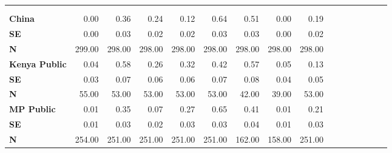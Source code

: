 \begin{tabular}{@{\extracolsep{5pt}}lrrrrrrrrrrrrrrr}
\toprule
&  &  &  &  &  &  &  &  \\
{\bf } &  &  &  &  &  &  &  &  \\
\hline
{\bf China} & 0.00\phantom{***} & 0.36\phantom{***} & 0.24\phantom{***} & 0.12\phantom{***} & 0.64\phantom{***} & 0.51\phantom{***} & 0.00\phantom{***} & 0.19\phantom{***} \\
{\bf SE} & 0.00\phantom{***} & 0.03\phantom{***} & 0.02\phantom{***} & 0.02\phantom{***} & 0.03\phantom{***} & 0.03\phantom{***} & 0.00\phantom{***} & 0.02\phantom{***} \\
{\bf N} & 299.00\phantom{***} & 298.00\phantom{***} & 298.00\phantom{***} & 298.00\phantom{***} & 298.00\phantom{***} & 298.00\phantom{***} & 298.00\phantom{***} & 298.00\phantom{***} \\
{\bf Kenya Public} & 0.04\phantom{***} & 0.58\phantom{***} & 0.26\phantom{***} & 0.32\phantom{***} & 0.42\phantom{***} & 0.57\phantom{***} & 0.05\phantom{***} & 0.13\phantom{***} \\
{\bf SE} & 0.03\phantom{***} & 0.07\phantom{***} & 0.06\phantom{***} & 0.06\phantom{***} & 0.07\phantom{***} & 0.08\phantom{***} & 0.04\phantom{***} & 0.05\phantom{***} \\
{\bf N} & 55.00\phantom{***} & 53.00\phantom{***} & 53.00\phantom{***} & 53.00\phantom{***} & 53.00\phantom{***} & 42.00\phantom{***} & 39.00\phantom{***} & 53.00\phantom{***} \\
{\bf MP Public} & 0.01\phantom{***} & 0.35\phantom{***} & 0.07\phantom{***} & 0.27\phantom{***} & 0.65\phantom{***} & 0.41\phantom{***} & 0.01\phantom{***} & 0.21\phantom{***} \\
{\bf SE} & 0.01\phantom{***} & 0.03\phantom{***} & 0.02\phantom{***} & 0.03\phantom{***} & 0.03\phantom{***} & 0.04\phantom{***} & 0.01\phantom{***} & 0.03\phantom{***} \\
{\bf N} & 254.00\phantom{***} & 251.00\phantom{***} & 251.00\phantom{***} & 251.00\phantom{***} & 251.00\phantom{***} & 162.00\phantom{***} & 158.00\phantom{***} & 251.00\phantom{***} \\
\hline
\end{tabular}
